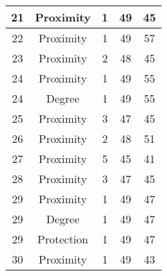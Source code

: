 \documentclass[results.tex]{subfiles}
\begin{document}
\begin{center}
\begin{tabular}{| c || c | c | c | c |}
            \hline
            21                      & Proximity                    & 1                      & 49                      & 45                   \\
            \hline
            22                      & Proximity                    & 1                      & 49                      & 57                   \\
            \hline
            23                      & Proximity                    & 2                      & 48                      & 45                   \\
            \hline
            24                      & Proximity                    & 1                      & 49                      & 55                   \\
            \hline
            24                      & Degree                       & 1                      & 49                      & 55                   \\
            \hline
            25                      & Proximity                    & 3                      & 47                      & 45                   \\
            \hline
            26                      & Proximity                    & 2                      & 48                      & 51                   \\
            \hline
            27                      & Proximity                    & 5                      & 45                      & 41                   \\
            \hline
            28                      & Proximity                    & 3                      & 47                      & 45                   \\
            \hline
            29                      & Proximity                    & 1                      & 49                      & 47                   \\
            \hline
            29                      & Degree                       & 1                      & 49                      & 47                   \\
            \hline
            29                      & Protection                   & 1                      & 49                      & 47                   \\
            \hline
            30                      & Proximity                    & 1                      & 49                      & 43                   \\

\end{tabular}
\end{center}
\end{document}
